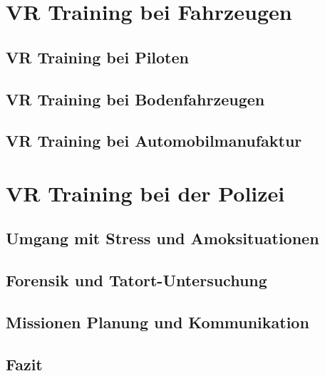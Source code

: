 \documentclass[
    12pt,
    a4paper,
    doubleside,
    BCOR=10mm,
    parskip=half,
    ngerman
]{scrbook}
\begin{document}
\chapter{VR Training bei Fahrzeugen}\label{sec:Fahrzeugen}

\section{VR Training bei Piloten}\label{sec:Piloten}

\section{VR Training bei Bodenfahrzeugen}\label{sec:Bodenfahrzeugen}

\section{VR Training bei Automobilmanufaktur}\label{sec:Automobilmanufaktur}

\chapter{VR Training bei der Polizei}\label{sec:polizei}

\section{Umgang mit Stress und Amoksituationen}\label{sec:polizei-SuA}

\section{Forensik und Tatort-Untersuchung}\label{sec:polizei-FuT}

\section{Missionen Planung und Kommunikation}\label{sec:polizei-PuK}

\section{Fazit}\label{sec:polizei-Fazit}




%
\end{document}

